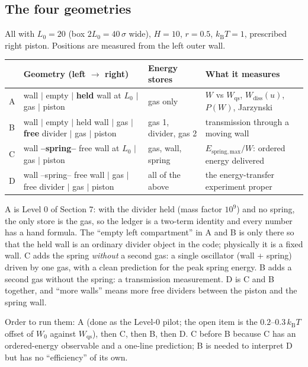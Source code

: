 \documentclass[11pt,a4paper]{article}
\newcommand{\kT}{k_{\mathrm B}T}
\begin{document}
\subsection{The four geometries}
All with $L_0 = 20$ (box $2L_0 = 40\,\sigma$ wide), $H = 10$, $r = 0.5$, $\kT = 1$, prescribed right piston. Positions are measured from the left outer wall.
\begin{center}
\footnotesize
\begin{tabular}{@{}lp{6.2cm}p{2.6cm}p{5.2cm}@{}}
\toprule
 & Geometry (left $\to$ right) & Energy stores & What it measures\\
\midrule
A & wall $|$ empty $|$ \textbf{held} wall at $L_0$ $|$ gas $|$ piston & gas only & $W$ vs $W_{\mathrm{qs}}$, $W_{\mathrm{diss}}(u)$, $P(W)$, Jarzynski\\
B & wall $|$ empty $|$ held wall $|$ gas $|$ \textbf{free} divider $|$ gas $|$ piston & gas 1, divider, gas 2 & transmission through a moving wall\\
C & wall \textbf{--spring--} free wall at $L_0$ $|$ gas $|$ piston & gas, wall, spring & $E_{\mathrm{spring,max}}/W$: ordered energy delivered\\
D & wall --spring-- free wall $|$ gas $|$ free divider $|$ gas $|$ piston & all of the above & the energy-transfer experiment proper\\
\bottomrule
\end{tabular}
\end{center}
A is Level 0 of Section 7: with the divider held (mass factor $10^9$) and no spring, the only store is the gas, so the ledger is a two-term identity and every number has a hand formula. The ``empty left compartment'' in A and B is only there so that the held wall is an ordinary divider object in the code; physically it is a fixed wall. C adds the spring \emph{without} a second gas: a single oscillator (wall + spring) driven by one gas, with a clean prediction for the peak spring energy. B adds a second gas without the spring: a transmission measurement. D is C and B together, and ``more walls'' means more free dividers between the piston and the spring wall.

Order to run them: A (done as the Level-0 pilot; the open item is the $0.2$--$0.3\,\kT$ offset of $W_0$ against $W_{\mathrm{qs}}$), then C, then B, then D. C before B because C has an ordered-energy observable and a one-line prediction; B is needed to interpret D but has no ``efficiency'' of its own.
\end{document}
